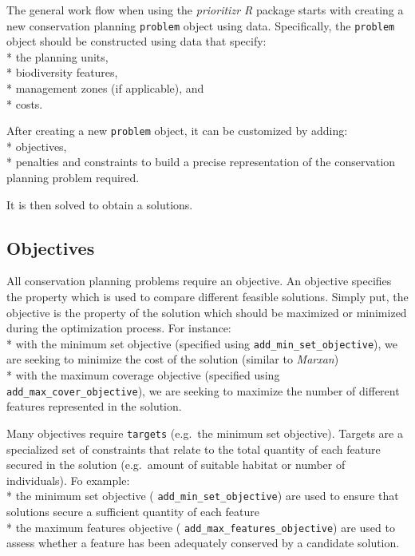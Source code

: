 \documentclass[
  12pt,
]{book}
\begin{document}
The general work flow when using the \emph{prioritizr R} package starts with creating a new conservation planning \texttt{problem} object using data. Specifically, the \texttt{problem} object should be constructed using data that specify:\\
* the planning units,\\
* biodiversity features,\\
* management zones (if applicable), and\\
* costs.

After creating a new \texttt{problem} object, it can be customized by adding:\\
* objectives,\\
* penalties and constraints
to build a precise representation of the conservation planning problem required.

It is then solved to obtain a solutions.

\hypertarget{objectives}{%
\subsection{Objectives}\label{objectives}}

All conservation planning problems require an objective. An objective specifies the property which is used to compare different feasible solutions. Simply put, the objective is the property of the solution which should be maximized or minimized during the optimization process. For instance:\\
* with the minimum set objective (specified using \texttt{add\_min\_set\_objective}), we are seeking to minimize the cost of the solution (similar to \emph{Marxan})\\
* with the maximum coverage objective (specified using \texttt{add\_max\_cover\_objective}), we are seeking to maximize the number of different features represented in the solution.

Many objectives require \texttt{targets} (e.g.~the minimum set objective). Targets are a specialized set of constraints that relate to the total quantity of each feature secured in the solution (e.g.~amount of suitable habitat or number of individuals). Fo example:\\
* the minimum set objective ( \texttt{add\_min\_set\_objective}) are used to ensure that solutions secure a sufficient quantity of each feature\\
* the maximum features objective ( \texttt{add\_max\_features\_objective}) are used to assess whether a feature has been adequately conserved by a candidate solution.
\end{document}
